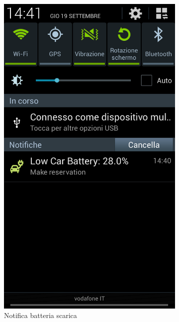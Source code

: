 \begin{figure}
\begin{subfigure}{0.45\textwidth}
		\includegraphics[width=\textwidth]{assets/mobile-app-notify.png}
		\caption{Notifica batteria scarica}
		\label{fig:notify}
	\end{subfigure}
	\begin{subfigure}{0.45\textwidth}

\end{subfigure}
\end{figure}
